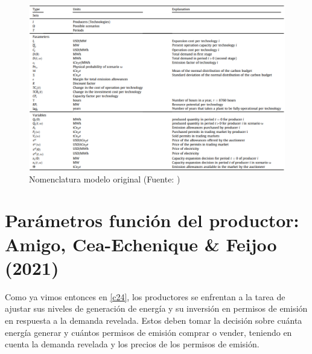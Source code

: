 \begin{figure}[H]
    \centering
    \includegraphics[width=17cm]{Samuel/Memoria Samuel/Imagenes/Tabla amigo.png}
    \caption{Nomenclatura modelo original (Fuente: \protect{})}
    \label{fig:Tabla1}
\end{figure}

\section{Parámetros función del productor: Amigo, Cea-Echenique \& Feijoo (2021)}\label{c25}

Como ya vimos entonces en \ref{c24}, los productores se enfrentan a la tarea de ajustar sus niveles de generación de energía y su inversión en permisos de emisión en respuesta a la demanda revelada. Estos deben tomar la decisión sobre cuánta energía generar y cuántos permisos de emisión comprar o vender, teniendo en cuenta la demanda revelada y los precios de los permisos de emisión.
\vspace{2.5mm}

